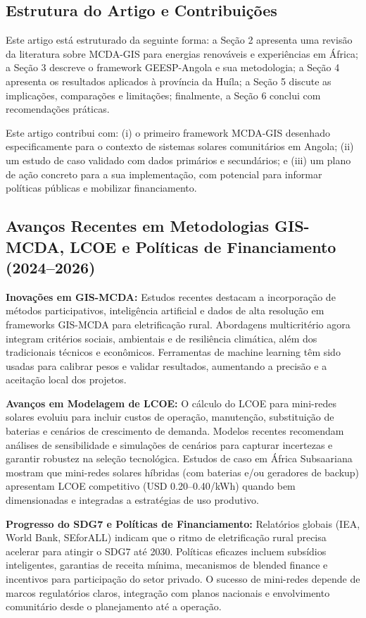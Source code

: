 \documentclass[12pt, a4paper]{article}
\begin{document}
\subsection{Estrutura do Artigo e Contribuições}
Este artigo está estruturado da seguinte forma: a Seção 2 apresenta uma revisão da literatura sobre MCDA-GIS para energias renováveis e experiências em África; a Seção 3 descreve o framework GEESP-Angola e sua metodologia; a Seção 4 apresenta os resultados aplicados à província da Huíla; a Seção 5 discute as implicações, comparações e limitações; finalmente, a Seção 6 conclui com recomendações práticas.

Este artigo contribui com: (i) o primeiro framework MCDA-GIS desenhado especificamente para o contexto de sistemas solares comunitários em Angola; (ii) um estudo de caso validado com dados primários e secundários; e (iii) um plano de ação concreto para a sua implementação, com potencial para informar políticas públicas e mobilizar financiamento.

\subsection{Avanços Recentes em Metodologias GIS-MCDA, LCOE e Políticas de Financiamento (2024–2026)}
\textbf{Inovações em GIS-MCDA:} Estudos recentes destacam a incorporação de métodos participativos, inteligência artificial e dados de alta resolução em frameworks GIS-MCDA para eletrificação rural. Abordagens multicritério agora integram critérios sociais, ambientais e de resiliência climática, além dos tradicionais técnicos e econômicos. Ferramentas de machine learning têm sido usadas para calibrar pesos e validar resultados, aumentando a precisão e a aceitação local dos projetos.

\textbf{Avanços em Modelagem de LCOE:} O cálculo do LCOE para mini-redes solares evoluiu para incluir custos de operação, manutenção, substituição de baterias e cenários de crescimento de demanda. Modelos recentes recomendam análises de sensibilidade e simulações de cenários para capturar incertezas e garantir robustez na seleção tecnológica. Estudos de caso em África Subsaariana mostram que mini-redes solares híbridas (com baterias e/ou geradores de backup) apresentam LCOE competitivo (USD 0.20–0.40/kWh) quando bem dimensionadas e integradas a estratégias de uso produtivo.

\textbf{Progresso do SDG7 e Políticas de Financiamento:} Relatórios globais (IEA, World Bank, SEforALL) indicam que o ritmo de eletrificação rural precisa acelerar para atingir o SDG7 até 2030. Políticas eficazes incluem subsídios inteligentes, garantias de receita mínima, mecanismos de blended finance e incentivos para participação do setor privado. O sucesso de mini-redes depende de marcos regulatórios claros, integração com planos nacionais e envolvimento comunitário desde o planejamento até a operação.
\end{document}
